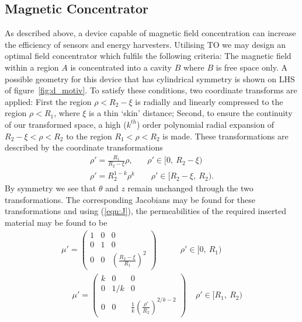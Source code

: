 \documentclass[11pt]{iopart}
\begin{document}
\subsection{Magnetic Concentrator}
As described above, a device capable of magnetic field concentration
can increase the efficiency of sensors and energy harvesters.
Utilising TO we may design an optimal field concentrator which fulfils
the following criteria: The magnetic field within a region $A$ is concentrated
into a cavity $B$ where $B$ is free space only. A possible geometry
for this device that has cylindrical symmetry is shown on LHS of
figure~\ref{fig:d_motiv}.  To satisfy these conditions, two coordinate
transforms are applied: First the region $\rho < R_2 - \xi$ is
radially and linearly compressed to the region $\rho < R_1$, where
$\xi$ is a thin `skin' distance; Second, to ensure the continuity of
our transformed space, a high ($k^{th}$) order polynomial radial
expansion of $R_2 - \xi < \rho < R_2$ to the region $R_1 < \rho < R_2$
is made. These transformations are described by the coordinate
transformations
\vspace{-0.2em}
\begin{equation}
  \label{eqn:transform}
  \begin{split}
\rho' = \frac{R_1}{R_2-\xi}\rho,~~~~~~~~\rho'\in[0,~R_2-\xi)~~\\
\rho' = R_2^{1-k}\rho^k~~~~~~~~~\rho'\in[R_2-\xi,~R_2).
  \end{split}
\end{equation}
\vspace{-0.2em}
By symmetry we see that $\theta$ and $z$ remain unchanged through the
two transformations. The corresponding Jacobians may be found for
these transformations and using (\ref{eqn:J}), the
permeabilities of the required inserted material may be found to be
\vspace{-0.2em}
\begin{equation}
  \label{eqn:mat}
  \begin{split}
 \mu' = \begin{pmatrix}1&0&0\\0&1&0\\0&0&(\frac{R_2-\xi}{R_1})^2\end{pmatrix}~~~~~~~~~~~~~\rho'\in[0,~R_1)~~\\
~~~~~~\mu' = \begin{pmatrix}k&0&0\\0&1/k&0\\0&0&\frac{1}{k}(\frac{\rho'}{R_2})^{2/k-2}\end{pmatrix}~~~~~\rho'\in[R_1,~R_2)
  \end{split}
\end{equation}
\end{document}
